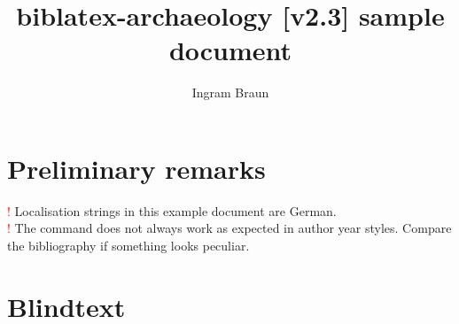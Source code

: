 \documentclass[a4paper,12pt]{scrartcl}
\title{biblatex-archaeology [v2.3] sample document}
\subtitle{\explhead}
\author{Ingram Braun}
\newcommand{\exmplwarn}[1]{\textcolor{red}{\Huge!} #1\\}
\begin{document}
\maketitle
\tableofcontents

\section{Preliminary remarks}

\exmplwarn{Localisation strings in this example document are German.}
    {\exmplwarn{The \detokenize{\fullcite} command does not always work as expected in author year styles. Compare the bibliography if something looks peculiar.}%
    }
    {}

\section{Blindtext}
\end{document}
